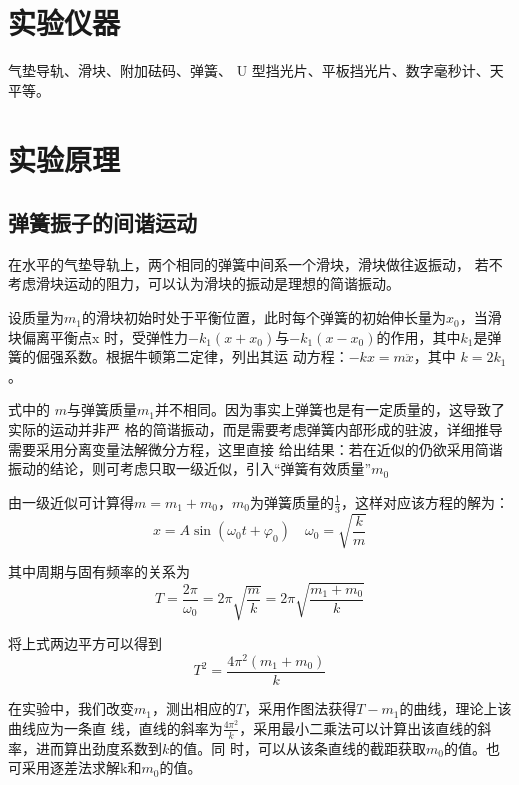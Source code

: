\documentclass[UTF8]{article}
\theoremstyle{MyLineTheoremStyle} %
\theoremstyle{MyBlockTheoremStyle} %
\theoremstyle{MySubsubsectionStyle} %
\begin{document}
\section{实验仪器}
    气垫导轨、滑块、附加砝码、弹簧、 U 型挡光片、平板挡光片、数字毫秒计、天平等。

\section{实验原理}
\subsection{弹簧振子的间谐运动}
在水平的气垫导轨上，两个相同的弹簧中间系一个滑块，滑块做往返振动，
若不考虑滑块运动的阻力，可以认为滑块的振动是理想的简谐振动。

设质量为$m_1$的滑块初始时处于平衡位置，此时每个弹簧的初始伸长量为$x_0$，当滑块偏离平衡点x
时，受弹性力$-k_1(x+x_0)$与$-k_1(x-x_0)$的作用，其中$k_1$是弹簧的倔强系数。根据牛顿第二定律，列出其运
动方程：$ - kx = m\ddot x$，其中 $k = 2 k_1$。

式中的 $m$与弹簧质量$m_1$并不相同。因为事实上弹簧也是有一定质量的，这导致了实际的运动并非严
格的简谐振动，而是需要考虑弹簧内部形成的驻波，详细推导需要采用分离变量法解微分方程，这里直接
给出结果：若在近似的仍欲采用简谐振动的结论，则可考虑只取一级近似，引入“弹簧有效质量”$m_0$

由一级近似可计算得$m = m_1 + m_0$，$m_0$为弹簧质量的$\frac{1}{3}$，这样对应该方程的解为：
\begin{equation}
    x = A\sin ({\omega _0}t + {\varphi _0})\quad {\omega _0} = \sqrt {\frac{k}{m}} 
\end{equation}

其中周期与固有频率的关系为
\begin{equation}
    T = \frac{{2\pi }}{{{\omega _0}}} = 2\pi \sqrt {\frac{m}{k}}  = 2\pi \sqrt {\frac{{{m_1} + {m_0}}}{k}} 
\end{equation}

将上式两边平方可以得到
\begin{equation}
    {T^2} = \frac{{4{\pi ^2}\left( {{m_1} + {m_0}} \right)}}{k}
\end{equation}

在实验中，我们改变$m_1$，测出相应的$T$，采用作图法获得$T-m_1$的曲线，理论上该曲线应为一条直
线，直线的斜率为$\frac{4 \pi^2}{k}$，采用最小二乘法可以计算出该直线的斜率，进而算出劲度系数到$k$的值。同
时，可以从该条直线的截距获取$m_0$的值。也可采用逐差法求解k和$m_0$的值。
\end{document}
